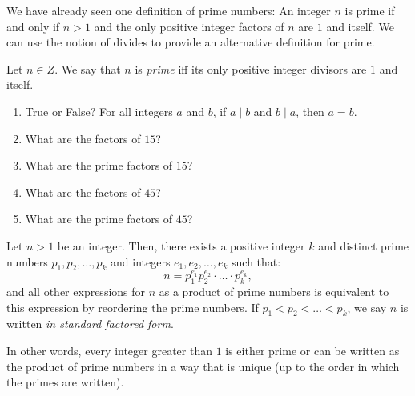 We have already seen one definition of prime numbers: An integer $n$ is prime if
and only if $n>1$ and the only positive integer factors of $n$ are $1$ and
itself.  We can use the notion
of divides to provide an alternative definition for prime.

\begin{definition}
    Let $n \in Z$.  We say that $n$ is \emph{prime} iff its only positive
    integer divisors are $1$ and itself.
\end{definition}



\begin{enumerate}
    \item True or False? For all integers $a$ and $b$, if $a \mid b$ and $b \mid
        a$, then $a=b$.
        \practice
    \item What are the factors of $15$?
        \practice
    \item What are the prime factors of $15$?
        \practice
    \item What are the factors of $45$?
        \practice
    \item What are the prime factors of $45$?
        \practice
\end{enumerate}

\begin{theorem}
    Let $n>1$ be an integer.  Then, there exists a positive integer $k$ and
    distinct prime numbers $p_1, p_2, \ldots, p_k$ and integers $e_1, e_2,
    \ldots, e_k$ such that:
    $$ n=p_1^{e_1}p_2^{e_2} \cdot \ldots \cdot p_k^{e_k},$$
    and all other expressions for $n$ as a product of prime numbers is
    equivalent to this expression by reordering the prime numbers.  If $p_1 <
    p_2 < \ldots < p_k$, we say $n$ is written \emph{in standard factored form}.
\end{theorem}

In other words, every integer greater than $1$ is either prime or can be written as the
product of prime numbers in a way that is unique (up to the order in which
the primes are written).
